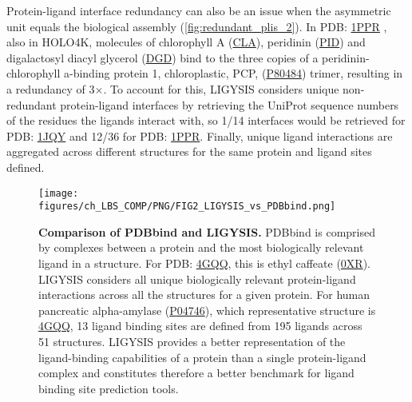 Protein-ligand interface redundancy can also be an issue when the asymmetric unit equals the biological assembly (\autoref{fig:redundant_plis_2}). In PDB: \href{https://www.ebi.ac.uk/pdbe/entry/pdb/1PPR}{1PPR} \cite{HOFMANN_1996_CAROTENOID}, also in HOLO4K, molecules of chlorophyll A (\href{https://www.ebi.ac.uk/pdbe-srv/pdbechem/chemicalCompound/show/CLA}{CLA}), peridinin (\href{https://www.ebi.ac.uk/pdbe-srv/pdbechem/chemicalCompound/show/PID}{PID}) and digalactosyl diacyl glycerol (\href{https://www.ebi.ac.uk/pdbe-srv/pdbechem/chemicalCompound/show/DGD}{DGD}) bind to the three copies of a peridinin-chlorophyll a-binding protein 1, chloroplastic, PCP, (\href{https://www.uniprot.org/uniprotkb/P80484/entry}{P80484}) trimer, resulting in a redundancy of 3$\times$. To account for this, LIGYSIS considers unique non-redundant protein-ligand interfaces by retrieving the UniProt sequence numbers of the residues the ligands interact with, so 1/14 interfaces would be retrieved for PDB: \href{https://www.ebi.ac.uk/pdbe/entry/pdb/1JQY}{1JQY} and 12/36 for PDB: \href{https://www.ebi.ac.uk/pdbe/entry/pdb/1PPR}{1PPR}. Finally, unique ligand interactions are aggregated across different structures for the same protein and ligand sites defined.

\begin{figure}[htb!]
    \centering
    \texttt{[image: figures/ch\_LBS\_COMP/PNG/FIG2\_LIGYSIS\_vs\_PDBbind.png]}
    \caption[Comparison of PDBbind and LIGYSIS]{\textbf{Comparison of PDBbind and LIGYSIS.} PDBbind is comprised by complexes between a protein and the most biologically relevant ligand in a structure. For PDB: \href{https://www.ebi.ac.uk/pdbe/entry/pdb/4GQQ}{4GQQ}, this is ethyl caffeate (\href{https://www.ebi.ac.uk/pdbe-srv/pdbechem/chemicalCompound/show/0XR}{0XR}). LIGYSIS considers all unique biologically relevant protein-ligand interactions across all the structures for a given protein. For human pancreatic alpha-amylase (\href{https://www.uniprot.org/uniprotkb/P04746/entry}{P04746}), which representative structure is \href{https://www.ebi.ac.uk/pdbe/entry/pdb/4GQQ}{4GQQ}, 13 ligand binding sites are defined from 195 ligands across 51 structures. LIGYSIS provides a better representation of the ligand-binding capabilities of a protein than a single protein-ligand complex and constitutes therefore a better benchmark for ligand binding site prediction tools.}
    \label{fig:PDBbind_VS_LIGYSIS}
\end{figure}


